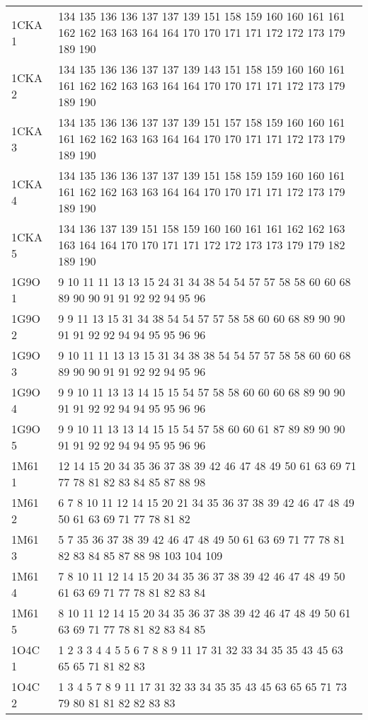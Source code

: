 \begin{table}[!htbp]
\begin{tabular}{ll}
        1CKA 1 & 134 135 136 136 137 137 139 151 158 159 160 160 161 161 162 162 163 163 164 164 170 170 171 171 172 172 173 179 189 190 \\
        1CKA 2 & 134 135 136 136 137 137 139 143 151 158 159 160 160 161 161 162 162 163 163 164 164 170 170 171 171 172 173 179 189 190 \\
        1CKA 3 & 134 135 136 136 137 137 139 151 157 158 159 160 160 161 161 162 162 163 163 164 164 170 170 171 171 172 173 179 189 190 \\
        1CKA 4 & 134 135 136 136 137 137 139 151 158 159 159 160 160 161 161 162 162 163 163 164 164 170 170 171 171 172 173 179 189 190 \\
        1CKA 5 & 134 136 137 139 151 158 159 160 160 161 161 162 162 163 163 164 164 170 170 171 171 172 172 173 173 179 179 182 189 190 \\
        1G9O 1 & 9 10 11 11 13 13 15 24 31 34 38 54 54 57 57 58 58 60 60 68 89 90 90 91 91 92 92 94 95 96 \\
        1G9O 2 & 9 9 11 13 15 31 34 38 54 54 57 57 58 58 60 60 68 89 90 90 91 91 92 92 94 94 95 95 96 96 \\
        1G9O 3 & 9 10 11 11 13 13 15 31 34 38 38 54 54 57 57 58 58 60 60 68 89 90 90 91 91 92 92 94 95 96 \\
        1G9O 4 & 9 9 10 11 13 13 14 15 15 54 57 58 58 60 60 60 68 89 90 90 91 91 92 92 94 94 95 95 96 96 \\
        1G9O 5 & 9 9 10 11 13 13 14 15 15 54 57 58 60 60 61 87 89 89 90 90 91 91 92 92 94 94 95 95 96 96 \\
        1M61 1 & 12 14 15 20 34 35 36 37 38 39 42 46 47 48 49 50 61 63 69 71 77 78 81 82 83 84 85 87 88 98 \\
        1M61 2 & 6 7 8 10 11 12 14 15 20 21 34 35 36 37 38 39 42 46 47 48 49 50 61 63 69 71 77 78 81 82 \\
        1M61 3 & 5 7 35 36 37 38 39 42 46 47 48 49 50 61 63 69 71 77 78 81 82 83 84 85 87 88 98 103 104 109 \\
        1M61 4 & 7 8 10 11 12 14 15 20 34 35 36 37 38 39 42 46 47 48 49 50 61 63 69 71 77 78 81 82 83 84 \\
        1M61 5 & 8 10 11 12 14 15 20 34 35 36 37 38 39 42 46 47 48 49 50 61 63 69 71 77 78 81 82 83 84 85 \\
        1O4C 1 & 1 2 3 3 4 4 5 5 6 7 8 8 9 11 17 31 32 33 34 35 35 43 45 63 65 65 71 81 82 83 \\
        1O4C 2 & 1 3 4 5 7 8 9 11 17 31 32 33 34 35 35 43 45 63 65 65 71 73 79 80 81 81 82 82 83 83 \\

\end{tabular}
\end{table}
